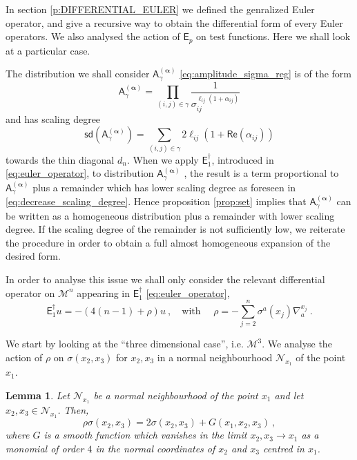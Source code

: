 \documentclass[11pt]{book}
\newcommand{\sd}{\mathsf{sd}}
\renewcommand{\Re}{\mathsf{Re}}
\newcommand{\alphabd}{\boldsymbol{\alpha}}
\newcommand{\Mcal}{\mathcal{M}}
\newcommand{\Ncal}{\mathcal{N}}
\newcommand{\Asf}{\mathsf{A}}
\newcommand{\Esf}{\mathsf{E}}
\theoremstyle{break}
\newtheorem{lemma}{Lemma}[chapter]
\begin{document}
In section \ref{p:DIFFERENTIAL_EULER} we defined the genralized Euler operator, and give a recursive way to obtain the differential form of every Euler operators. We also analysed the action of $\Esf_p$ on test functions. Here we shall look at a particular case. 


The distribution we shall consider $\Asf^{(\alphabd)}_\gamma$ \eqref{eq:amplitude_sigma_reg} is of the form
%
\begin{equation*}
\Asf_\gamma^{(\alphabd)}=\prod_{(i,j)\in\gamma} \frac{1}{\sigma_{ij}^{\ell_{ij}(1+ \alpha_{ij})}} 
\end{equation*}
%
and has scaling degree 
%
\begin{equation*}
\sd(\Asf_\gamma^{(\alphabd)}) = \sum_{(i,j)\in\gamma} 2 \ell_{ij}\left(1+ \Re(\alpha_{ij})\right) 
\end{equation*}
%
towards the thin diagonal $d_n$. When we apply $\Esf^\dagger_1$, introduced in \eqref{eq:euler_operator}, to distribution $\Asf_\gamma^{(\alphabd)}$ , the result is a term proportional to $\Asf_\gamma^{(\alphabd)}$ plus a remainder which has lower scaling degree as foreseen in \eqref{eq:decrease_scaling_degree}. Hence proposition \ref{prop:set} implies that $\Asf_\gamma^{(\alphabd)}$ can be written as a homogeneous distribution plus a remainder with lower scaling degree. If the scaling degree of the remainder is not sufficiently low, we reiterate the procedure in order to obtain a full almost homogeneous expansion of the desired form.


In order to analyse this issue we shall only consider the relevant differential operator on $\Mcal^n$ appearing in $\Esf_1^\dagger$ \eqref{eq:euler_operator},
%
\begin{equation*}
\Esf_1^\dagger u = - \left( 4(n-1) + \rho \right) u \ , \quad \mbox{with } \quad 
\rho = - \sum_{j=2}^n \sigma^a(x_j) \nabla^{x_j}_a \ .    
\end{equation*}


We start by looking at the ``three dimensional case'', i.e.  $\Mcal^3$. We analyse the action of $\rho$ on $\sigma(x_2,x_3)$ for $x_2,x_3$ in a normal neighbourhood $\Ncal_{x_1}$ of the point $x_1$.


\begin{lemma}\label{lem:rho_over_squared}
Let $\Ncal_{x_1}$ be a normal neighbourhood of the point $x_1$ and let $x_2,x_3 \in \Ncal_{x_1}$. Then,
%
\begin{equation*}
\rho \sigma(x_2,x_3) = 2\sigma(x_2,x_3) + G(x_1,x_2,x_3) \ ,
\end{equation*}
%
where $G$ is a smooth function which vanishes in the limit $x_2,x_3 \to x_1$ as a monomial of order $4$ in the normal coordinates of $x_2$ and $x_3$ centred in $x_1$. 
\end{lemma}
\end{document}
